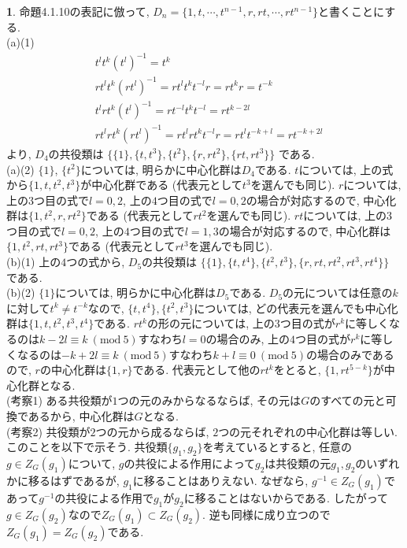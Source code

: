 \documentclass{amsart}
\theoremstyle{definition}
\newtheorem{ans}{}
\numberwithin{ans}{subsection}
\begin{document}
\begin{ans}
  命題4.1.10の表記に倣って, $D_n = \{1, t, \cdots , t^{n-1}, r, rt, \cdots , rt^{n-1}\}$と書くことにする.\\
  (a)(1)
  \begin{align*}
    &t^lt^k(t^l)^{-1} = t^k\\
    &rt^lt^k(rt^l)^{-1} = rt^lt^kt^{-l}r = rt^kr = t^{-k}\\
    &t^lrt^k(t^l)^{-1} = rt^{-l}t^kt^{-l} = rt^{k-2l}\\
    &rt^lrt^k(rt^l)^{-1} = rt^lrt^kt^{-l}r = rt^lt^{-k+l} = rt^{-k+2l}
  \end{align*}
  より, $D_4$の共役類は
  $\{
    \{1\},
    \{t, t^3\},
    \{t^2\},
    \{r, rt^2\},
    \{rt, rt^3\}
  \}$
  である.\\
  (a)(2) $\{1\}$, $\{t^2\}$については, 明らかに中心化群は$D_4$である.
  $t$については, 上の式から$\{1, t, t^2, t^3\}$が中心化群である (代表元として$t^3$を選んでも同じ).
  $r$については, 上の$3$つ目の式で$l = 0, 2$, 上の$4$つ目の式で$l = 0, 2$の場合が対応するので,
  中心化群は$\{1, t^2, r, rt^2\}$である (代表元として$rt^2$を選んでも同じ).
  $rt$については, 上の$3$つ目の式で$l = 0, 2$, 上の$4$つ目の式で$l = 1, 3$の場合が対応するので,
  中心化群は$\{1, t^2, rt, rt^3\}$である (代表元として$rt^3$を選んでも同じ).\\
  (b)(1)
  上の$4$つの式から, $D_5$の共役類は
  $\{
    \{1\},
    \{t, t^4\},
    \{t^2, t^3\},
    \{r, rt, rt^2, rt^3, rt^4\}
  \}$
  である.\\
  (b)(2) $\{1\}$については, 明らかに中心化群は$D_5$である.
  $D_5$の元については任意の$k$に対して$t^k \neq t^{-k}$なので,
  $\{t, t^4\}, \{t^2, t^3\}$については,
  どの代表元を選んでも中心化群は$\{1, t, t^2, t^3, t^4\}$である.
  $rt^k$の形の元については, 上の$3$つ目の式が$r^k$に等しくなるのは$k - 2l \equiv k\ (\mathrm{mod}\ 5)$すなわち$l = 0$の場合のみ,
  上の$4$つ目の式が$r^k$に等しくなるのは$-k + 2l \equiv k\ (\mathrm{mod}\ 5)$すなわち$k + l \equiv 0\ (\mathrm{mod}\ 5)$の場合のみであるので,
  $r$の中心化群は$\{1, r\}$である. 代表元として他の$rt^k$をとると, $\{1, rt^{5-k}\}$が中心化群となる.\\
  (考察1) ある共役類が$1$つの元のみからなるならば, その元は$G$のすべての元と可換であるから, 中心化群は$G$となる.\\
  (考察2) 共役類が$2$つの元から成るならば, $2$つの元それぞれの中心化群は等しい.
  このことを以下で示そう.
  共役類$\{g_1, g_2\}$を考えているとすると,
  任意の$g \in Z_G(g_1)$について, $g$の共役による作用によって$g_2$は共役類の元$g_1, g_2$のいずれかに移るはずであるが, $g_1$に移ることはありえない.
  なぜなら, $g^{-1} \in Z_G(g_1)$であって$g^{-1}$の共役による作用で$g_1$が$g_2$に移ることはないからである.
  したがって$g \in Z_G(g_2)$なので$Z_G(g_1) \subset Z_G(g_2)$. 逆も同様に成り立つので$Z_G(g_1) = Z_G(g_2)$である.
\end{ans}
\end{document}
